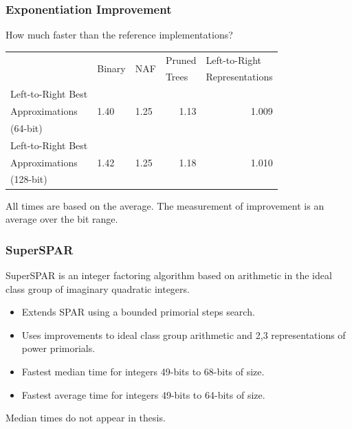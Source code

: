 \documentclass{beamer}
\newcommand{\smallfont}{\fontsize{6pt}{7.2}\selectfont}
\begin{document}
\begin{frame}
\frametitle{Exponentiation Improvement}
How much faster than the reference implementations?
\begin{table}
\centering
\begin{tabular}{ | l | l | l | l | l | }
\hline
& \multirow{2}{*}{Binary} & \multirow{2}{*}{NAF} & Pruned & Left-to-Right \\
& & & Trees & Representations \\
\hline
Left-to-Right Best & \multirow{3}{*}{1.40} & \multirow{3}{*}{1.25} & \multicolumn{1}{|r|}{\multirow{3}{*}{1.13}} & \multicolumn{1}{|r|}{\multirow{3}{*}{1.009}} \\
Approximations & & & &\\
(64-bit) & & & &\\

\hline

Left-to-Right Best & \multirow{3}{*}{1.42} & \multirow{3}{*}{1.25} & \multicolumn{1}{|r|}{\multirow{3}{*}{1.18}} & \multicolumn{1}{|r|}{\multirow{3}{*}{1.010}} \\
Approximations & & & &\\
(128-bit) & & & &\\

\hline
\end{tabular}
\end{table}

\bigskip
\smallfont
All times are based on the average.  The measurement of improvement is an average over the bit range.
\end{frame}




\begin{frame}
\frametitle{SuperSPAR}
SuperSPAR is an integer factoring algorithm based on arithmetic in the ideal class group of imaginary quadratic integers.
\begin{itemize}
\item Extends SPAR using a bounded primorial steps search.
\item Uses improvements to ideal class group arithmetic and 2,3 representations of power primorials.
\item Fastest median time for integers 49-bits to 68-bits of size.
\item Fastest average time for integers 49-bits to 64-bits of size.
\end{itemize}
\bigbreak
\smallfont
Median times do not appear in thesis.
\end{frame}
\end{document}

